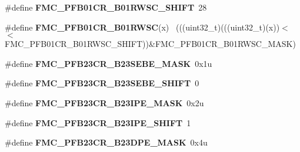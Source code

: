 \begin{DoxyCompactItemize}
\item 
\hypertarget{group___f_m_c___register___masks_ga59b9b49fb93b21456b84aeaef04c0e3b}{}\#define {\bfseries F\+M\+C\+\_\+\+P\+F\+B01\+C\+R\+\_\+\+B01\+R\+W\+S\+C\+\_\+\+S\+H\+I\+F\+T}~28\label{group___f_m_c___register___masks_ga59b9b49fb93b21456b84aeaef04c0e3b}

\item 
\hypertarget{group___f_m_c___register___masks_gaba608bdc98901bf742ec03afa8196679}{}\#define {\bfseries F\+M\+C\+\_\+\+P\+F\+B01\+C\+R\+\_\+\+B01\+R\+W\+S\+C}(x)                                  ~(((uint32\+\_\+t)(((uint32\+\_\+t)(x))$<$$<$F\+M\+C\+\_\+\+P\+F\+B01\+C\+R\+\_\+\+B01\+R\+W\+S\+C\+\_\+\+S\+H\+I\+F\+T))\&F\+M\+C\+\_\+\+P\+F\+B01\+C\+R\+\_\+\+B01\+R\+W\+S\+C\+\_\+\+M\+A\+S\+K)\label{group___f_m_c___register___masks_gaba608bdc98901bf742ec03afa8196679}

\item 
\hypertarget{group___f_m_c___register___masks_gadf5eac2a896bb46989cc6d0595405bc9}{}\#define {\bfseries F\+M\+C\+\_\+\+P\+F\+B23\+C\+R\+\_\+\+B23\+S\+E\+B\+E\+\_\+\+M\+A\+S\+K}~0x1u\label{group___f_m_c___register___masks_gadf5eac2a896bb46989cc6d0595405bc9}

\item 
\hypertarget{group___f_m_c___register___masks_gaff0f230dd48545a046823bf507871732}{}\#define {\bfseries F\+M\+C\+\_\+\+P\+F\+B23\+C\+R\+\_\+\+B23\+S\+E\+B\+E\+\_\+\+S\+H\+I\+F\+T}~0\label{group___f_m_c___register___masks_gaff0f230dd48545a046823bf507871732}

\item 
\hypertarget{group___f_m_c___register___masks_gaacbaf4dbe23a64baf6948c513118a0b4}{}\#define {\bfseries F\+M\+C\+\_\+\+P\+F\+B23\+C\+R\+\_\+\+B23\+I\+P\+E\+\_\+\+M\+A\+S\+K}~0x2u\label{group___f_m_c___register___masks_gaacbaf4dbe23a64baf6948c513118a0b4}

\item 
\hypertarget{group___f_m_c___register___masks_ga7e2fb2ce75183953008fd7d375d4ef3f}{}\#define {\bfseries F\+M\+C\+\_\+\+P\+F\+B23\+C\+R\+\_\+\+B23\+I\+P\+E\+\_\+\+S\+H\+I\+F\+T}~1\label{group___f_m_c___register___masks_ga7e2fb2ce75183953008fd7d375d4ef3f}

\item 
\hypertarget{group___f_m_c___register___masks_gaf4599e350cc9e042851913e998b6e186}{}\#define {\bfseries F\+M\+C\+\_\+\+P\+F\+B23\+C\+R\+\_\+\+B23\+D\+P\+E\+\_\+\+M\+A\+S\+K}~0x4u\label{group___f_m_c___register___masks_gaf4599e350cc9e042851913e998b6e186}


\end{DoxyCompactItemize}
